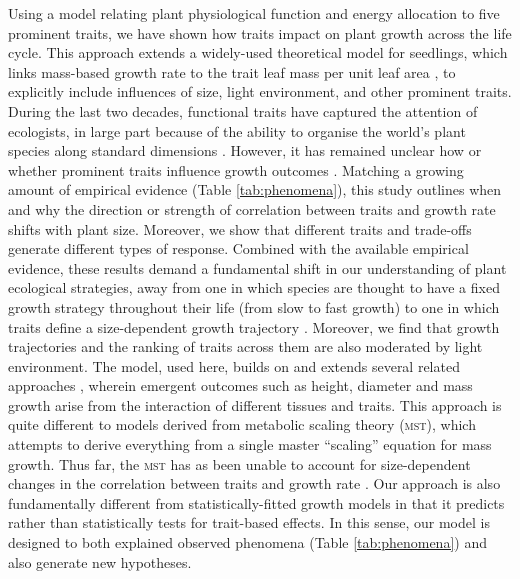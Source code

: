 \documentclass[a4paper,11pt]{article}
\begin{document}
Using a model relating plant physiological function and energy allocation to five prominent traits, we have shown how traits impact on plant growth across the life cycle. This approach extends a widely-used theoretical model for seedlings, which links mass-based growth rate to the trait leaf mass per unit leaf area \citep{Lambers-1992, Wright-2000}, to explicitly include influences of size, light environment, and other prominent traits. During the last two decades, functional traits have captured the attention of ecologists, in large part because of the ability to organise the world's plant species along standard dimensions \citep{Westoby-2002}. However, it has remained unclear how or whether prominent traits influence growth outcomes \citep{Poorter-2008, Wright-2010,Paine-2015}. Matching a growing amount of empirical evidence (Table \ref{tab:phenomena}), this study outlines when and why the direction or strength of correlation between traits and growth rate shifts with plant size. Moreover, we show that different traits and trade-offs generate different types of response. Combined with the available empirical evidence, these results demand a fundamental shift in our understanding of plant ecological strategies, away from one in which species are thought to have a fixed growth strategy throughout their life (from slow to fast growth) \citep[e.g.][]{Grime-1977, Adler-2014, Paine-2015} to one in which traits define a size-dependent growth trajectory \citep{Gibert-2016}. Moreover, we find that growth trajectories and the ranking of traits across them are also moderated by light environment. The {\plant} model, used here, builds on and extends several related approaches \citet[e.g.][]{Givnish-1988, Makela-1997, Moorcroft-2001}, wherein emergent outcomes such as height, diameter and mass growth arise from the interaction of different tissues and traits. This approach is quite different to models derived from metabolic scaling theory (\textsc{mst}), which attempts to derive everything from a single master ``scaling'' equation for mass growth. Thus far, the \textsc{mst} has as been unable to account for size-dependent changes in the correlation between traits and growth rate \citep{Enquist-1999, Enquist-2007}. Our approach is also fundamentally different from statistically-fitted growth models \citep[e.g.][]{Herault-2011, Ruger-2012, Iida-2014} in that it predicts rather than statistically tests for trait-based effects. In this sense, our model is designed to both explained observed phenomena (Table \ref{tab:phenomena}) and also generate new hypotheses.
\end{document}

